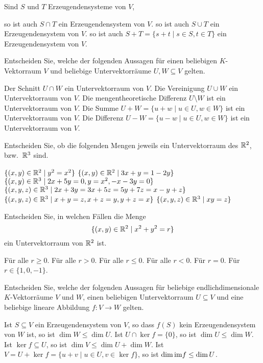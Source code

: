 \documentclass[a4paper,10pt]{exam}
\begin{document}
\begin{questions}
Sind $S$ und $T$ Erzeugendensysteme von $V$,
\begin{checkboxes}
 \choice
  so ist auch $S \cap T$ ein Erzeugendensystem von $V$.
 \choice
  so ist auch $S \cup T$ ein Erzeugendensystem von $V$.
 \choice
  so ist auch $S + T = \{s + t \mid s \in S, t \in T\}$ ein Erzeugendensystem von $V$.
\end{checkboxes}






\question Entscheiden Sie, welche der folgenden Aussagen für einen beliebigen $K$-Vektorraum $V$ und beliebige Untervektorräume $U,W \subseteq V$ gelten.
\begin{checkboxes}
 \choice
  Der Schnitt $U \cap W$ ein Untervektorraum von $V$.
 \choice
  Die Vereinigung $U \cup W$ ein Untervektorraum von $V$.
 \choice
  Die mengentheoretische Differenz $U \setminus W$ ist ein Untervektorraum von $V$.
 \choice
  Die Summe $U + W = \{u + w \mid u \in U, w \in W\}$ ist ein Untervektorraum von $V$.
 \choice
  Die Differenz $U - W = \{u - w \mid u \in U, w \in W\}$ ist ein Untervektorraum von $V$.
\end{checkboxes}


\question Entscheiden Sie, ob die folgenden Mengen jeweils ein Untervektorraum des $\mathbb{R}^2$, bzw.\ $\mathbb{R}^3$ sind.
\begin{checkboxes}
 \choice
  $\{(x,y) \in \mathbb{R}^2 \mid y^2 = x^2\}$
 \choice
  $\{(x,y) \in \mathbb{R}^2 \mid 3x+y = 1-2y\}$
 \choice
  $\{(x,y) \in \mathbb{R}^3 \mid 2x+5y = 0, y = x^2, -x-3y = 0\}$
 \choice
  $\{(x,y,z) \in \mathbb{R}^3 \mid 2x+3y = 3x+5z = 5y+7z = x-y+z\}$
 \choice
  $\{(x,y,z) \in \mathbb{R}^3 \mid  x+y = z, x+z = y, y+z = x\}$
 \choice
  $\{(x,y,z) \in \mathbb{R}^3 \mid xy = z\}$
\end{checkboxes}


\question Entscheiden Sie, in welchen Fällen die Menge
\[
  \{(x,y) \in \mathbb{R}^2 \mid x^2 + y^2 = r\}
\]
ein Untervektorraum von $\mathbb{R}^2$ ist.
\begin{checkboxes}
 \choice
  Für alle $r \geq 0$.
 \choice
  Für alle $r > 0$.
 \choice
  Für alle $r \leq 0$.
 \choice
  Für alle $r < 0$.
 \choice
  Für $r = 0$.
 \choice
  Für $r \in \{1,0,-1\}$.
\end{checkboxes}







\question Entscheiden Sie, welche der folgenden Aussagen für beliebige endlichdimensionale $K$-Vektorräume $V$ und $W$, einen beliebigen Untervektorraum $U \subseteq V$ und eine beliebige lineare Abbildung $f \colon V \to W$ gelten.
\begin{checkboxes}
 \choice
  Ist $S \subseteq V$ ein Erzeugendensystem von $V$, so dass $f(S)$ kein Erzeugendensystem von $W$ ist, so ist $\dim W \leq \dim U$.
 \choice
  Ist $U \cap \ker f = \{0\}$, so ist $\dim U \leq \dim W$.
 \choice
  Ist $\ker f \subseteq U$, so ist $\dim V \leq \dim U + \dim W$.
 \choice
  Ist $V = U + \ker f = \{u + v \mid u \in U, v \in \ker f\}$, so ist $\dim \mathrm{im} f \leq \dim U$.
\end{checkboxes}



\end{questions}
\end{document}
